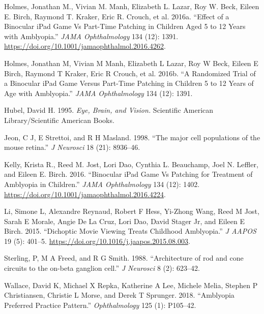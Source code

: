 \documentclass[
  letterpaper,
]{book}
\newlength{\cslhangindent}
\newlength{\cslentryspacingunit} %
\newenvironment{CSLReferences}[2] %
 {%
  \setlength{\parindent}{0pt}
  \ifodd #1
  \let\oldpar\par
  \def\par{\hangindent=\cslhangindent\oldpar}
  \fi
  \setlength{\parskip}{#2\cslentryspacingunit}
 }%
 {}
\begin{document}
\begin{CSLReferences}{1}{0}
\leavevmode{}%
Holmes, Jonathan M., Vivian M. Manh, Elizabeth L. Lazar, Roy W. Beck,
Eileen E. Birch, Raymond T. Kraker, Eric R. Crouch, et al. 2016a.
{``Effect of a Binocular iPad Game Vs Part-Time Patching in Children
Aged 5 to 12 Years with Amblyopia.''} \emph{JAMA Ophthalmology} 134
(12): 1391. \url{https://doi.org/10.1001/jamaophthalmol.2016.4262}.

\leavevmode{}%
Holmes, Jonathan M, Vivian M Manh, Elizabeth L Lazar, Roy W Beck, Eileen
E Birch, Raymond T Kraker, Eric R Crouch, et al. 2016b. {``A Randomized
Trial of a Binocular iPad Game Versus Part-Time Patching in Children 5
to 12 Years of Age with Amblyopia.''} \emph{JAMA Ophthalmology} 134
(12): 1391.

\leavevmode{}%
Hubel, David H. 1995. \emph{Eye, Brain, and Vision.} Scientific American
Library/Scientific American Books.

\leavevmode{}%
Jeon, C J, E Strettoi, and R H Masland. 1998. {``{The major cell
populations of the mouse retina}.''} \emph{J Neurosci} 18 (21):
8936--46.

\leavevmode{}%
Kelly, Krista R., Reed M. Jost, Lori Dao, Cynthia L. Beauchamp, Joel N.
Leffler, and Eileen E. Birch. 2016. {``Binocular iPad Game Vs Patching
for Treatment of Amblyopia in Children.''} \emph{JAMA Ophthalmology} 134
(12): 1402. \url{https://doi.org/10.1001/jamaophthalmol.2016.4224}.

\leavevmode{}%
Li, Simone L, Alexandre Reynaud, Robert F Hess, Yi-Zhong Wang, Reed M
Jost, Sarah E Morale, Angie De La Cruz, Lori Dao, David Stager Jr, and
Eileen E Birch. 2015. {``Dichoptic Movie Viewing Treats Childhood
Amblyopia.''} \emph{J AAPOS} 19 (5): 401--5.
\url{https://doi.org/10.1016/j.jaapos.2015.08.003}.

\leavevmode{}%
Sterling, P, M A Freed, and R G Smith. 1988. {``{Architecture of rod and
cone circuits to the on-beta ganglion cell}.''} \emph{J Neurosci} 8 (2):
623--42.

\leavevmode{}%
Wallace, David K, Michael X Repka, Katherine A Lee, Michele Melia,
Stephen P Christiansen, Christie L Morse, and Derek T Sprunger. 2018.
{``Amblyopia Preferred Practice Pattern{\textregistered}.''}
\emph{Ophthalmology} 125 (1): P105--42.


\end{CSLReferences}
\end{document}
